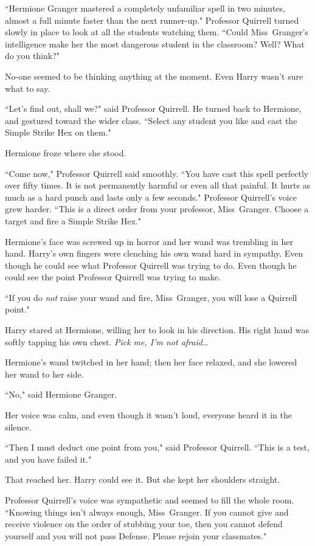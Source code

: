 ``Hermione Granger mastered a completely unfamiliar spell in two minutes, almost a full minute faster than the next runner-up." Professor Quirrell turned slowly in place to look at all the students watching them. ``Could Miss~Granger's intelligence make her the most dangerous student in the classroom? Well? What do you think?"

No-one seemed to be thinking anything at the moment. Even Harry wasn't sure what to say.

``Let's find out, shall we?" said Professor Quirrell. He turned back to Hermione, and gestured toward the wider class. ``Select any student you like and cast the Simple Strike Hex on them."

Hermione froze where she stood.

``Come now," Professor Quirrell said smoothly. ``You have cast this spell perfectly over fifty times. It is not permanently harmful or even all that painful. It hurts as much as a hard punch and lasts only a few seconds." Professor Quirrell's voice grew harder. ``This is a direct order from your professor, Miss~Granger. Choose a target and fire a Simple Strike Hex."

Hermione's face was screwed up in horror and her wand was trembling in her hand. Harry's own fingers were clenching his own wand hard in sympathy. Even though he could see what Professor Quirrell was trying to do. Even though he could see the point Professor Quirrell was trying to make.

``If you do \emph{not} raise your wand and fire, Miss~Granger, you will lose a Quirrell point."

Harry stared at Hermione, willing her to look in his direction. His right hand was softly tapping his own chest. \emph{Pick me, I'm not afraid{\ldots}}

Hermione's wand twitched in her hand; then her face relaxed, and she lowered her wand to her side.

``No," said Hermione Granger.

Her voice was calm, and even though it wasn't loud, everyone heard it in the silence.

``Then I must deduct one point from you," said Professor Quirrell. ``This is a test, and you have failed it."

That reached her. Harry could see it. But she kept her shoulders straight.

Professor Quirrell's voice was sympathetic and seemed to fill the whole room. ``Knowing things isn't always enough, Miss~Granger. If you cannot give and receive violence on the order of stubbing your toe, then you cannot defend yourself and you will not pass Defense. Please rejoin your classmates."

